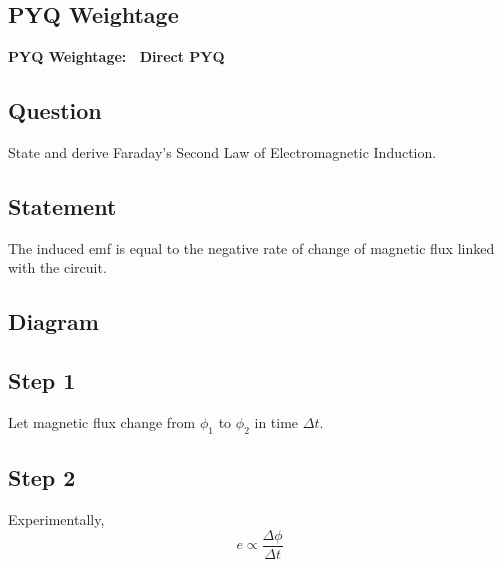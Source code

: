 \documentclass[11pt,a4paper]{article}
\begin{document}
\subsection*{PYQ Weightage}
\begin{tcolorbox}[colback=yellow!10!white, colframe=orange, halign=center]
    \textbf{PYQ Weightage: \textasteriskcentered\textasteriskcentered\textasteriskcentered\textasteriskcentered\textasteriskcentered\ Direct PYQ}
\end{tcolorbox}

\subsection*{Question}
State and derive Faraday's Second Law of Electromagnetic Induction.

\subsection*{Statement}
The induced emf is equal to the negative rate of change of magnetic flux linked with the circuit.

\subsection*{Diagram}
\begin{center}
\end{center}

\subsection*{Step 1}
Let magnetic flux change from \( \phi_1 \) to \( \phi_2 \) in time \( \Delta t \).

\subsection*{Step 2}
Experimentally,
\[ e \propto \frac{\Delta\phi}{\Delta t} \]
\end{document}
